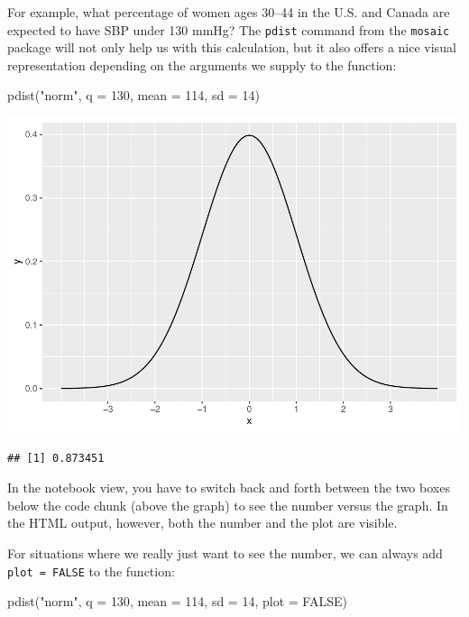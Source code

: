 \documentclass[
]{book}
\newenvironment{Shaded}{\begin{snugshade}}{\end{snugshade}}
\newcommand{\AttributeTok}[1]{\textcolor[rgb]{0.77,0.63,0.00}{#1}}
\newcommand{\ConstantTok}[1]{\textcolor[rgb]{0.00,0.00,0.00}{#1}}
\newcommand{\DecValTok}[1]{\textcolor[rgb]{0.00,0.00,0.81}{#1}}
\newcommand{\FunctionTok}[1]{\textcolor[rgb]{0.00,0.00,0.00}{#1}}
\newcommand{\NormalTok}[1]{#1}
\newcommand{\StringTok}[1]{\textcolor[rgb]{0.31,0.60,0.02}{#1}}
\begin{document}
For example, what percentage of women ages 30--44 in the U.S. and Canada are expected to have SBP under 130 mmHg? The \texttt{pdist} command from the \texttt{mosaic} package will not only help us with this calculation, but it also offers a nice visual representation depending on the arguments we supply to the function:

\begin{Shaded}
\begin{Highlighting}[]
\FunctionTok{pdist}\NormalTok{(}\StringTok{"norm"}\NormalTok{, }\AttributeTok{q =} \DecValTok{130}\NormalTok{, }\AttributeTok{mean =} \DecValTok{114}\NormalTok{, }\AttributeTok{sd =} \DecValTok{14}\NormalTok{)}
\end{Highlighting}
\end{Shaded}

\includegraphics{intro_stats_files/figure-latex/unnamed-chunk-337-1.pdf}

\begin{verbatim}
## [1] 0.873451
\end{verbatim}

In the notebook view, you have to switch back and forth between the two boxes below the code chunk (above the graph) to see the number versus the graph. In the HTML output, however, both the number and the plot are visible.

For situations where we really just want to see the number, we can always add \texttt{plot\ =\ FALSE} to the function:

\begin{Shaded}
\begin{Highlighting}[]
\FunctionTok{pdist}\NormalTok{(}\StringTok{"norm"}\NormalTok{, }\AttributeTok{q =} \DecValTok{130}\NormalTok{, }\AttributeTok{mean =} \DecValTok{114}\NormalTok{, }\AttributeTok{sd =} \DecValTok{14}\NormalTok{, }\AttributeTok{plot =} \ConstantTok{FALSE}\NormalTok{)}
\end{Highlighting}
\end{Shaded}
\end{document}
